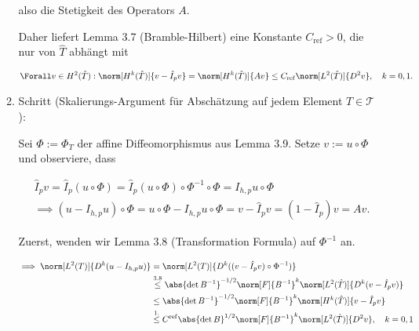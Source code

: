 \begin{solution}
\begin{enumerate}[label = \textbf{\alph*)}]
\begin{enumerate}[label = \arabic*.]
    also die Stetigkeit des Operators $A$.


    Daher liefert Lemma 3.7 (Bramble-Hilbert) eine Konstante $C_\mathrm{ref} > 0$, die nur von $\hat T$ abhängt mit

    \begin{align*}
      \Forall v \in H^2(\hat T):
      \norm[H^k(\hat T)]{v - \hat I_p v}
      =
      \norm[H^k(\hat T)]{A v}
      \leq
      C_\mathrm{ref}
      \norm[L^2(\hat T)]{D^2 v},
      \quad
      k = 0, 1.
    \end{align*}

    \item Schritt (Skalierungs-Argument für Abschätzung auf jedem Element $T \in \mathcal{T}$):

    Sei $\Phi := \Phi_T$ der affine Diffeomorphismus aus Lemma 3.9.
    Setze $v := u \circ \Phi$ und observiere, dass

    \begin{align*}
      &
      \hat I_p v
      =
      \hat I_p (u \circ \Phi)
      =
      \hat I_p (u \circ \Phi) \circ \Phi^{-1} \circ \Phi
      =
      I_{h, p} u \circ \Phi \\
      & \implies
      (u - I_{h, p} u) \circ \Phi
      =
      u \circ \Phi - I_{h, p} u \circ \Phi
      =
      v - \hat I_p v
      =
      (1 - \hat I_p) v
      =
      A v.
    \end{align*}

    Zuerst, wenden wir Lemma 3.8 (Transformation Formula) auf $\Phi^{-1}$ an.


    \begin{align*}
      \implies
      \norm[L^2(T)]{D^k (u - I_{h, p} u)}
      & =
      \norm[L^2(T)]{D^k ((v - \hat I_p v) \circ \Phi^{-1})} \\
      & \stackrel
      {
        \mathrm{3.8}
      }{\leq}
      \abs{\det B^{-1}}^{-1/2} \norm[F]{B^{-1}}^k \norm[L^2(\hat T)]{D^k (v - \hat I_p v)} \\
      & \leq
      \abs{\det B^{-1}}^{-1/2} \norm[F]{B^{-1}}^k \norm[H^k(\hat T)]{v - \hat I_p v} \\
      & \stackrel
      {
        \mathrm{1.}
      }{\leq}
      C^\mathrm{ref} \abs{\det B}^{1/2} \norm[F]{B^{-1}}^k \norm[L^2(\hat T)]{D^2 v},
      \quad
      k = 0, 1
    \end{align*}


\end{enumerate}
\end{enumerate}
\end{solution}
